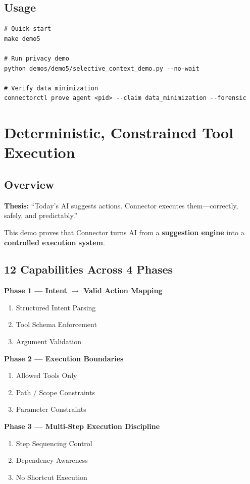 \documentclass[11pt,a4paper]{article}
\begin{document}
\subsection{Usage}

\begin{lstlisting}
# Quick start
make demo5

# Run privacy demo
python demos/demo5/selective_context_demo.py --no-wait

# Verify data minimization
connectorctl prove agent <pid> --claim data_minimization --forensic
\end{lstlisting}

\newpage

\section{Deterministic, Constrained Tool Execution}

\subsection{Overview}
\textbf{Thesis:} ``Today's AI suggests actions. Connector executes them---correctly, safely, and predictably.''

This demo proves that Connector turns AI from a \textbf{suggestion engine} into a \textbf{controlled execution system}.

\subsection{12 Capabilities Across 4 Phases}

\textbf{Phase 1 --- Intent $\rightarrow$ Valid Action Mapping}
\begin{enumerate}[nosep]
    \item Structured Intent Parsing
    \item Tool Schema Enforcement
    \item Argument Validation
\end{enumerate}

\textbf{Phase 2 --- Execution Boundaries}
\begin{enumerate}
    \item Allowed Tools Only
    \item Path / Scope Constraints
    \item Parameter Constraints
\end{enumerate}

\textbf{Phase 3 --- Multi-Step Execution Discipline}
\begin{enumerate}
    \item Step Sequencing Control
    \item Dependency Awareness
    \item No Shortcut Execution
\end{enumerate}
\end{document}
